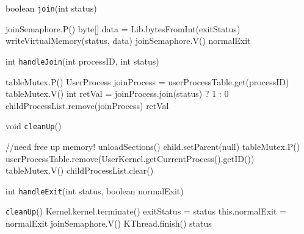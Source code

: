 \documentclass{article}
\begin{document}
\begin{spacing}{1.1}
\begin{algorithm}[htbp]
\label{alg:join}
\caption{boolean \texttt{join}(int status)}
  \begin{algorithmic}
    \STATE joinSemaphore.P()
    \STATE byte[] data = Lib.bytesFromInt(exitStatus)
    \STATE writeVirtualMemory(status, data)
    \STATE joinSemaphore.V()
    \RETURN normalExit
  \end{algorithmic}
\end{algorithm}

\begin{algorithm}[htbp]
\label{alg:handleJoin}
\caption{int \texttt{handleJoin}(int processID, int status)}
  \begin{algorithmic}
    \STATE \colorbox{myyellow}{tableMutex.P()}
    \STATE UserProcess joinProcess = userProcessTable.get(processID)
    \STATE \colorbox{myyellow}{tableMutex.V()}
    \ENDIF
    \STATE int retVal = joinProcess.join(status) ? 1 : 0
    \STATE childProcessList.remove(joinProcess)
    \RETURN retVal
  \end{algorithmic}
\end{algorithm}

\begin{algorithm}[htbp]
\label{alg:cleanUp}
\caption{void \texttt{cleanUp}()}
  \begin{algorithmic}
    \ENDIF
    \ENDFOR
    \STATE \colorbox{myyellow}{//need free up memory!}
    \STATE unloadSections()
      \STATE child.setParent(null)
    \ENDIF
    \ENDFOR
    \STATE \colorbox{myyellow}{tableMutex.P()}
    \STATE userProcessTable.remove(UserKernel.getCurrentProcess().getID())
    \STATE \colorbox{myyellow}{tableMutex.V()}
    \STATE childProcessList.clear()
  \end{algorithmic}
\end{algorithm}

\begin{algorithm}[htbp]
\label{alg:handleExit}
\caption{int \texttt{handleExit}(int status, boolean normalExit)}
  \begin{algorithmic}
    \STATE \texttt{cleanUp}()
      \STATE Kernel.kernel.terminate()
    \ENDIF
    \STATE exitStatus = status
    \STATE this.normalExit = normalExit
    \STATE joinSemaphore.V()
    \STATE \colorbox{myyellow}{KThread.finish()}
    \RETURN status
  \end{algorithmic}
\end{algorithm}


\end{spacing}
\end{document}
